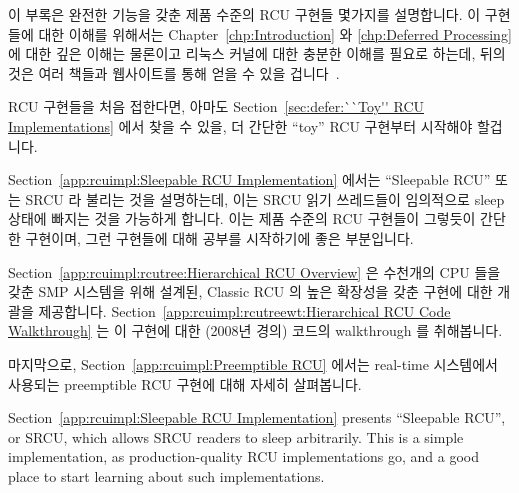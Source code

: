 

이 부록은 완전한 기능을 갖춘 제품 수준의 RCU 구현들 몇가지를 설명합니다.
이 구현들에 대한 이해를 위해서는
Chapter~\ref{chp:Introduction} 와
\ref{chp:Deferred Processing} 에 대한 깊은 이해는 물론이고 리눅스 커널에 대한
충분한 이해를 필요로 하는데, 뒤의 것은 여러 책들과 웹사이트를 통해 얻을 수 있을
겁니다~\cite{BovetCesati2005,CorbetRubiniKroahHartman,CorbetLWN,RobertLove2005}.

RCU 구현들을 처음 접한다면, 아마도
Section~\ref{sec:defer:``Toy'' RCU Implementations} 에서 찾을 수 있을, 더
간단한 ``toy'' RCU 구현부터 시작해야 할겁니다.
\iffalse

This appendix describes several fully functional production-quality RCU
implementations.
Understanding of these implementations requires a thorough understanding
of the material in
Chapters~\ref{chp:Introduction} and
\ref{chp:Deferred Processing},
as well as a reasonably good understanding of the Linux kernel,
the latter of which may be found in several textbooks and
websites~\cite{BovetCesati2005,CorbetRubiniKroahHartman,CorbetLWN,RobertLove2005}.

If you are new to RCU implementations, you should start with the
simpler ``toy'' RCU implementations that may be found in
Section~\ref{sec:defer:``Toy'' RCU Implementations}.
\fi

Section~\ref{app:rcuimpl:Sleepable RCU Implementation} 에서는 ``Sleepable RCU''
또는 SRCU 라 불리는 것을 설명하는데, 이는 SRCU 읽기 쓰레드들이 임의적으로 sleep
상태에 빠지는 것을 가능하게 합니다.
이는 제품 수준의 RCU 구현들이 그렇듯이 간단한 구현이며, 그런 구현들에 대해
공부를 시작하기에 좋은 부분입니다.

Section~\ref{app:rcuimpl:rcutree:Hierarchical RCU Overview} 은 수천개의 CPU
들을 갖춘 SMP 시스템을 위해 설계된, Classic RCU 의 높은 확장성을 갖춘 구현에
대한 개괄을 제공합니다.
Section~\ref{app:rcuimpl:rcutreewt:Hierarchical RCU Code Walkthrough} 는 이
구현에 대한 (2008년 경의) 코드의 walkthrough 를 취해봅니다.

마지막으로,
Section~\ref{app:rcuimpl:Preemptible RCU}
에서는 real-time 시스템에서 사용되는 preemptible RCU 구현에 대해 자세히
살펴봅니다.
\iffalse

Section~\ref{app:rcuimpl:Sleepable RCU Implementation} presents
``Sleepable RCU'', or SRCU, which allows SRCU readers to sleep
arbitrarily.
This is a simple implementation, as production-quality RCU implementations
go, and a good place to start learning about such implementations.

